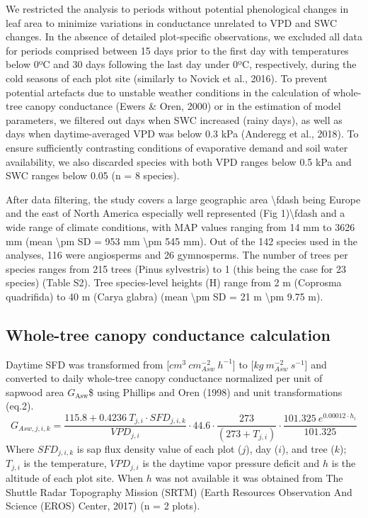\documentclass[11pt,twoside]{reedthesis}
\begin{document}
We restricted the analysis to periods without potential phenological
changes in leaf area to minimize variations in conductance unrelated to
VPD and SWC changes. In the absence of detailed plot-specific
observations, we excluded all data for periods comprised between 15 days
prior to the first day with temperatures below 0ºC and 30 days following
the last day under 0ºC, respectively, during the cold seasons of each
plot site (similarly to Novick et al., 2016). To prevent potential
artefacts due to unstable weather conditions in the calculation of
whole-tree canopy conductance (Ewers \& Oren, 2000) or in the estimation
of model parameters, we filtered out days when SWC increased (rainy
days), as well as days when daytime-averaged VPD was below 0.3 kPa
(Anderegg et al., 2018). To ensure sufficiently contrasting conditions
of evaporative demand and soil water availability, we also discarded
species with both VPD ranges below 0.5 kPa and SWC ranges below 0.05 (n
= 8 species).\par

After data filtering, the study covers a large geographic area
\textbackslash{}fdash being Europe and the east of North America
especially well represented (Fig 1)\textbackslash{}fdash and a wide
range of climate conditions, with MAP values ranging from 14 mm to 3626
mm (mean \textbackslash{}pm SD = 953 mm \textbackslash{}pm 545 mm). Out
of the 142 species used in the analyses, 116 were angiosperms and 26
gymnosperms. The number of trees per species ranges from 215 trees
(Pinus sylvestris) to 1 (this being the case for 23 species) (Table S2).
Tree species-level heights (H) range from 2 m (Coprosma quadrifida) to
40 m (Carya glabra) (mean \textbackslash{}pm SD = 21 m
\textbackslash{}pm 9.75 m).\par

\subsection{Whole-tree canopy conductance
calculation}\label{whole-tree-canopy-conductance-calculation}

Daytime SFD was transformed from
{[}\(cm^3 \: cm_{Asw}^{-2} \: h^{-1}\){]} to
{[}\(kg \: m_{Asw}^{-2} \: s^{-1}\){]} and converted to daily whole-tree
canopy conductance normalized per unit of sapwood area
\(G_{\text{Asw}}\)\$ using Phillips and Oren (1998) and unit
transformations (eq.2).
\begin{equation}
G_{Asw,j,i,k} = \frac{115.8 + 0.4236 \: T_{j , i} \cdot SFD_{j , i , k}}{VPD_{j,i}}\cdot 44.6 \cdot \frac{273}{(273 + T_{j,i})} \cdot \frac{101.325 \: e^{0.00012 \cdot h_i}}{101.325}
\end{equation}
Where \(SFD_{j,i,k}\) is sap flux density value of each plot (\(j\)),
day (\(i\)), and tree (\(k\)); \(T_{j,i}\) is the temperature,
\(VPD_{j,i}\) is the daytime vapor pressure deficit and \(h\) is the
altitude of each plot site. When \(h\) was not available it was obtained
from The Shuttle Radar Topography Mission (SRTM) (Earth Resources
Observation And Science (EROS) Center, 2017) (n = 2 plots).\par
\end{document}
